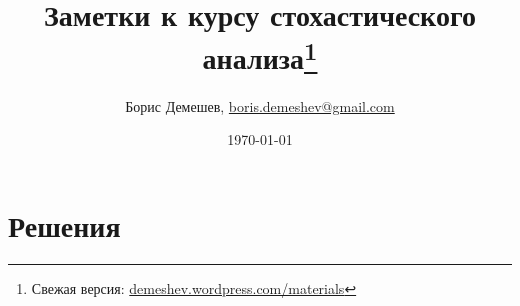 \documentclass[pdftex,12pt,a4paper]{article}
\title{Заметки к курсу стохастического анализа\footnote{Свежая версия: \url{demeshev.wordpress.com/materials}}}
\author{Борис Демешев, \href{mailto:boris.demeshev@gmail.com}{boris.demeshev@gmail.com} }
\date{\today}
\numberwithin{equation}{page} %
\theoremstyle{definition} %
\theoremstyle{definition}
\theoremstyle{definition}
\begin{document}

\maketitle
\tableofcontents{}






\problemonly


\restoresection
\section{Решения}
\solutiononly

\restoresection





\printindex %
\end{document}

